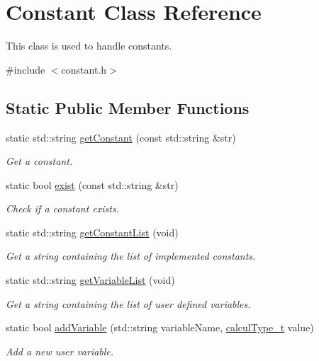 \hypertarget{class_constant}{}\section{Constant Class Reference}
\label{class_constant}


This class is used to handle constants.  




{\ttfamily \#include $<$constant.\+h$>$}

\subsection*{Static Public Member Functions}
\begin{DoxyCompactItemize}
\item 
static std\+::string \hyperlink{class_constant_a086fe0e1f8d42475cf03f81ae9ccce12}{get\+Constant} (const std\+::string \&str)
\begin{DoxyCompactList}\small\item\em Get a constant. \end{DoxyCompactList}\item 
static bool \hyperlink{class_constant_a2123372df263446010225865fb0a6928}{exist} (const std\+::string \&str)
\begin{DoxyCompactList}\small\item\em Check if a constant exists. \end{DoxyCompactList}\item 
static std\+::string \hyperlink{class_constant_a55802cdca68fe477a661fa8d426d5ae7}{get\+Constant\+List} (void)
\begin{DoxyCompactList}\small\item\em Get a string containing the list of implemented constants. \end{DoxyCompactList}\item 
static std\+::string \hyperlink{class_constant_af25afa9fd97935831fb5edddffadb00e}{get\+Variable\+List} (void)
\begin{DoxyCompactList}\small\item\em Get a string containing the list of user defined variables. \end{DoxyCompactList}\item 
static bool \hyperlink{class_constant_aabc7cc09c77ce3b3dcf020129825af1c}{add\+Variable} (std\+::string variable\+Name, \hyperlink{mpfr_interface_8h_a993860352aef57b15399903c4475a608}{calcul\+Type\+\_\+t} value)
\begin{DoxyCompactList}\small\item\em Add a new user variable. \end{DoxyCompactList}\item 

\end{DoxyCompactItemize}
